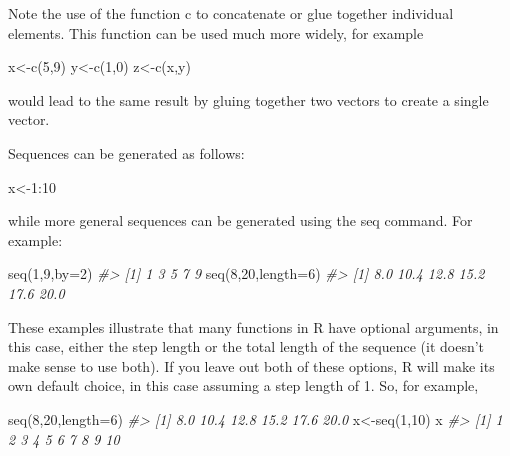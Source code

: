 \documentclass[
]{book}
\newenvironment{Shaded}{\begin{snugshade}}{\end{snugshade}}
\newcommand{\AttributeTok}[1]{\textcolor[rgb]{0.77,0.63,0.00}{#1}}
\newcommand{\CommentTok}[1]{\textcolor[rgb]{0.56,0.35,0.01}{\textit{#1}}}
\newcommand{\DecValTok}[1]{\textcolor[rgb]{0.00,0.00,0.81}{#1}}
\newcommand{\FunctionTok}[1]{\textcolor[rgb]{0.00,0.00,0.00}{#1}}
\newcommand{\NormalTok}[1]{#1}
\newcommand{\OtherTok}[1]{\textcolor[rgb]{0.56,0.35,0.01}{#1}}
\newcommand{\SpecialCharTok}[1]{\textcolor[rgb]{0.00,0.00,0.00}{#1}}
\begin{document}
Note the use of the function c to concatenate or glue together individual elements. This function
can be used much more widely, for example

\begin{Shaded}
\begin{Highlighting}[]
\NormalTok{x}\OtherTok{\textless{}{-}}\FunctionTok{c}\NormalTok{(}\DecValTok{5}\NormalTok{,}\DecValTok{9}\NormalTok{)}
\NormalTok{y}\OtherTok{\textless{}{-}}\FunctionTok{c}\NormalTok{(}\DecValTok{1}\NormalTok{,}\DecValTok{0}\NormalTok{)}
\NormalTok{z}\OtherTok{\textless{}{-}}\FunctionTok{c}\NormalTok{(x,y)}
\end{Highlighting}
\end{Shaded}

would lead to the same result by gluing together two vectors to create a single vector.

Sequences can be generated as follows:

\begin{Shaded}
\begin{Highlighting}[]
\NormalTok{x}\OtherTok{\textless{}{-}}\DecValTok{1}\SpecialCharTok{:}\DecValTok{10}
\end{Highlighting}
\end{Shaded}

while more general sequences can be generated using the seq command. For example:

\begin{Shaded}
\begin{Highlighting}[]
\FunctionTok{seq}\NormalTok{(}\DecValTok{1}\NormalTok{,}\DecValTok{9}\NormalTok{,}\AttributeTok{by=}\DecValTok{2}\NormalTok{)}
\CommentTok{\#\textgreater{} [1] 1 3 5 7 9}
\FunctionTok{seq}\NormalTok{(}\DecValTok{8}\NormalTok{,}\DecValTok{20}\NormalTok{,}\AttributeTok{length=}\DecValTok{6}\NormalTok{)}
\CommentTok{\#\textgreater{} [1]  8.0 10.4 12.8 15.2 17.6 20.0}
\end{Highlighting}
\end{Shaded}

These examples illustrate that many functions in R have optional arguments, in this case, either the step length or the total length of the sequence (it doesn't make sense to use both). If you leave out both of these options, R will make its own default choice, in this case assuming a step length
of 1. So, for example,

\begin{Shaded}
\begin{Highlighting}[]
\FunctionTok{seq}\NormalTok{(}\DecValTok{8}\NormalTok{,}\DecValTok{20}\NormalTok{,}\AttributeTok{length=}\DecValTok{6}\NormalTok{)}
\CommentTok{\#\textgreater{} [1]  8.0 10.4 12.8 15.2 17.6 20.0}
\NormalTok{x}\OtherTok{\textless{}{-}}\FunctionTok{seq}\NormalTok{(}\DecValTok{1}\NormalTok{,}\DecValTok{10}\NormalTok{)}
\NormalTok{x}
\CommentTok{\#\textgreater{}  [1]  1  2  3  4  5  6  7  8  9 10}
\end{Highlighting}
\end{Shaded}
\end{document}

